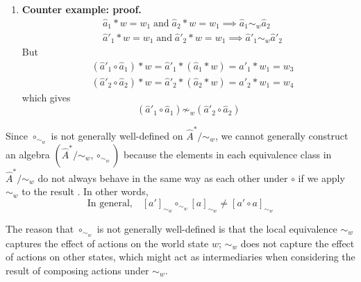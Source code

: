 \begin{proofE}
\begin{enumerate}
    \item \textbf{Counter example: proof.}
    \begin{align}
        & \hat{a}_{1} \ast w = w_{1} \; \text{and} \; \hat{a}_{2} \ast w = w_{1} \implies \hat{a}_{1} \sim_{w} \hat{a}_{2} \\
        & \hat{a}'_{1} \ast w = w_{1} \; \text{and} \; \hat{a}'_{2} \ast w = w_{1} \implies \hat{a}'_{1} \sim_{w} \hat{a}'_{2}
    \end{align}
    But
    \begin{align}
        & (\hat{a}'_{1} \circ \hat{a}_{1}) \ast w = \hat{a}'_{1} \ast (\hat{a}_{1} \ast w) = \hat{a}'_{1} \ast w_{1} = w_{3} \\
        & (\hat{a}'_{2} \circ \hat{a}_{2}) \ast w = \hat{a}'_{2} \ast (\hat{a}_{2} \ast w) = \hat{a}'_{2} \ast w_{1} = w_{4}
    \end{align}
    which gives
    \begin{equation}
        (\hat{a}'_{1} \circ \hat{a}_{1}) \not\sim_{w} (\hat{a}'_{2} \circ \hat{a}_{2})
    \end{equation}
\end{enumerate}
\end{proofE}

Since $\circ_{\sim_{w}}$ is not generally well-defined on $\hat{A}^{*}/\sim_{w}$, we cannot generally construct an algebra $(\hat{A}^{*}/\sim_{w}, \circ_{\sim_{w}})$ because the elements in each equivalence class in $\hat{A}^{*}/\sim_{w}$ do not always behave in the same way as each other under $\circ$ if we apply $\sim_{w}$ to the result .
In other words,
\begin{equation}
    \text{In general,} \quad [a']_{\sim_{w}} \circ_{\sim_{w}} [a]_{\sim_{w}} \neq [a' \circ a]_{\sim_{w}}
\end{equation}

The reason that $\circ_{\sim_{w}}$ is not generally well-defined is that the local equivalence $\sim_{w}$ captures the effect of actions on the world state $w$; $\sim_{w}$ does not capture the effect of actions on other states, which might act as intermediaries when considering the result of composing actions under $\sim_{w}$.



